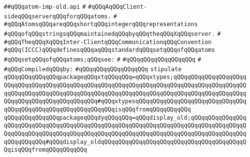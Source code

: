 \label{src/lib/x-kit/xclient/src/iccc/atom-imp-old.api}
\verb|##qQQqatom-imp-old.api|\newline
\verb|#|\newline
\verb|#qQQqAqQQqClient-sideqQQqserverqQQqforqQQqatoms.|\newline
\verb|#|\newline
\verb|#qQQqAtomsqQQqareqQQqshortqQQqintegerqQQqrepresentations|\newline
\verb|#qQQqofqQQqstringsqQQqmaintainedqQQqbyqQQqtheqQQqXqQQqserver.|\newline
\verb|#|\newline
\verb|#qQQqTheqQQqXqQQqInter-ClientqQQqCommunicationqQQqConvention|\newline
\verb|#qQQq(ICCC)qQQqdefinesqQQqaqQQqstandardqQQqsetqQQqofqQQqatoms|\newline
\verb|#qQQqsetqQQqofqQQqatoms;qQQqsee:|\newline
\verb|#|\newline
\verb|#qQQqqQQqqQQqqQQqqQQq|\newline
\verb|#|\newline
\newline
\verb|#qQQqCompiledqQQqby:|\newline
\verb|#qQQqqQQqqQQqqQQqqQQq|\newline
\newline
\newline
\verb|stipulate|\newline
\verb|qQQqqQQqqQQqqQQqpackageqQQqxtqQQqqQQq=qQQqxtypes;qQQqqQQqqQQqqQQqqQQqqQQqqQQqqQQqqQQqqQQqqQQqqQQqqQQqqQQqqQQqqQQqqQQqqQQqqQQqqQQqqQQqqQQqqQQqqQQqqQQqqQQqqQQqqQQqqQQqqQQqqQQqqQQqqQQqqQQqqQQqqQQqqQQqqQQqqQQqqQQqqQQqqQQqqQQqqQQqqQQqqQQqqQQq#qQQqxtypesqQQqqQQqqQQqqQQqqQQqqQQqqQQqqQQqqQQqqQQqqQQqqQQqqQQqqQQqqQQqqQQqisqQQqfromqQQqqQQqqQQq|\newline
\verb|qQQqqQQqqQQqqQQqpackageqQQqdyqQQqqQQq=qQQqdisplay_old;qQQqqQQqqQQqqQQqqQQqqQQqqQQqqQQqqQQqqQQqqQQqqQQqqQQqqQQqqQQqqQQqqQQqqQQqqQQqqQQqqQQqqQQqqQQqqQQqqQQqqQQqqQQqqQQqqQQqqQQqqQQqqQQqqQQqqQQqqQQqqQQqqQQqqQQqqQQqqQQqqQQqqQQq#qQQqdisplay_oldqQQqqQQqqQQqqQQqqQQqqQQqqQQqqQQqqQQqqQQqqQQqisqQQqfromqQQqqQQqqQQq|\newline
